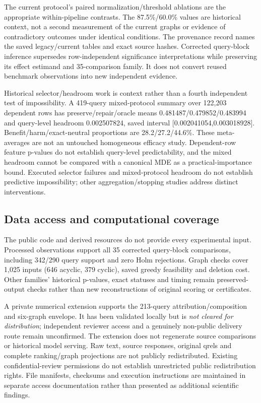 \documentclass[pdflatex,sn-basic,Numbered]{sn-jnl}
\begin{document}
The current protocol's paired normalization/threshold ablations are the appropriate within-pipeline contrasts. The 87.5\%/60.0\% values are historical context, not a second measurement of the current graphs or evidence of contradictory outcomes under identical conditions. The provenance record names the saved legacy/current tables and exact source hashes. Corrected query-block inference supersedes row-independent significance interpretations while preserving its effect estimand and 35-comparison family. It does not convert reused benchmark observations into new independent evidence.




Historical selector/headroom work is context rather than a fourth independent test of impossibility. A 419-query mixed-protocol summary over 122,203 dependent rows has preserve/repair/oracle means 0.481487/0.479852/0.483994 and query-level headroom 0.002507824, saved interval [0.002041054,0.003018928]. Benefit/harm/exact-neutral proportions are 28.2/27.2/44.6\%. These meta-averages are not an untouched homogeneous efficacy study. Dependent-row feature p-values do not establish query-level predictability, and the mixed headroom cannot be compared with a canonical MDE as a practical-importance bound. Executed selector failures and mixed-protocol headroom do not establish predictive impossibility; other aggregation/stopping studies address distinct interventions.

\subsection{Data access and computational coverage}\label{sec:si-access}
The public code and derived resources do not provide every experimental input. Processed observations support all 35 corrected query-block comparisons, including 342/290 query support and zero Holm rejections. Graph checks cover 1,025 inputs (646 acyclic, 379 cyclic), saved greedy feasibility and deletion cost. Other families' historical p-values, exact statuses and timing remain preserved-output checks rather than new reconstructions of original scoring or certificates.

A private numerical extension supports the 213-query attribution/composition and six-graph envelope. It has been validated locally but is \emph{not cleared for distribution}; independent reviewer access and a genuinely non-public delivery route remain unconfirmed. The extension does not regenerate source comparisons or historical model serving. Raw text, source responses, original qrels and complete ranking/graph projections are not publicly redistributed. Existing confidential-review permissions do not establish unrestricted public redistribution rights. File manifests, checksums and execution instructions are maintained in separate access documentation rather than presented as additional scientific findings.
\end{document}
